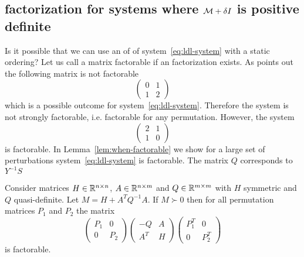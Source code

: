 \documentclass{article}
\begin{document}




\if{}

\subsection{\LDL{} factorization for systems where $\mathcal{M} + \delta I$ is positive definite}

Is it possible that we can use an of \LDL{} of system~\eqref{eq:ldl-system} with a static ordering? Let us call a matrix factorable if an \LDL{} factorization exists. As \citet{vanderbei1995symmetric} points out the following matrix is not factorable
$$
\left( \begin{matrix}
0 & 1 \\
1 & 2
\end{matrix} \right)
$$
which is a possible outcome for system~\eqref{eq:ldl-system}. Therefore the system is not strongly factorable, i.e. factorable for any permutation. However, the system 
$$
\left( \begin{matrix}
2 & 1 \\
1 & 0
\end{matrix} \right)
$$
is factorable. In Lemma~\ref{lem:when-factorable} we show for a large set of perturbations system~\eqref{eq:ldl-system} is factorable. The matrix $Q$ corresponds to $Y^{-1} S$

\begin{lemma}\label{lem:when-factorable}
Consider matrices $H  \in \mathbb{R}^{n \times n}$, $A \in \mathbb{R}^{n \times m}$ and $Q \in \mathbb{R}^{m \times m}$ with $H$ symmetric and $Q$ quasi-definite. Let $M = H + A^T Q^{-1} A$. If $M \succ 0$ then for all permutation matrices $P_{1}$ and $P_{2}$ the matrix
$$
\left( \begin{matrix}
P_{1} & 0 \\
0 & P_{2}
\end{matrix} \right)
\left( \begin{matrix}
-Q & A  \\
A^T & H
\end{matrix} \right)
\left( \begin{matrix}
P_{1}^T & 0 \\
0 & P_{2}^T
\end{matrix} \right)
$$
is factorable.
\end{lemma}
\end{document}
